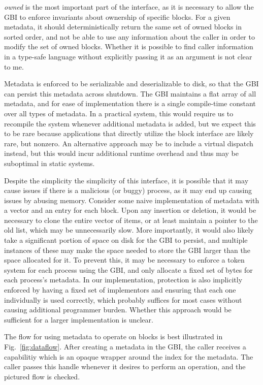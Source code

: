 \documentclass[letterpaper,twocolumn,10pt]{article}
\begin{document}
\textit{owned} is the most important part of the interface, as it is necessary to allow the GBI
to enforce invariants about ownership of specific blocks. For a given metadata, it should
deterministically return the same set of owned blocks in sorted order, and not be able to use
any information about the caller in order to modify the set of owned blocks. Whether it is
possible to find caller information in a type-safe language without explicitly passing it as an
argument is not clear to me.

Metadata is enforced to be serializable and deserializable to disk, so that the GBI can persist
this metadata across shutdown. The GBI maintains a flat array of all metadata, and for ease of
implementation there is a single compile-time constant over all types of metadata. In a
practical system, this would require us to recompile the system whenever additional metadata is
added, but we expect this to be rare because applications that directly utilize the block
interface are likely rare, but nonzero. An alternative approach may be to include a virtual
dispatch instead, but this would incur additional runtime overhead and thus may be suboptimal in
static systems.

Despite the simplicity the simplicity of this interface, it is possible that it may cause issues
if there is a malicious (or buggy) process, as it may end up causing issues by abusing memory.
Consider some naive implementation of metadata with a vector and an entry for each block.
Upon any insertion or deletion, it would be necessary to clone the entire vector of items, or at
least maintain a pointer to the old list, which may be unnecessarily slow. More importantly, it
would also likely take a significant portion of space on disk for the GBI to persist, and
multiple instances of these may make the space needed to store the GBI larger than the space
allocated for it. To prevent this, it may be necessary to enforce a token system for each
process using the GBI, and only allocate a fixed set of bytes for each process's metadata.  In
our implementation, protection is also implicitly enforced by having a fixed set of implementors
and ensuring that each one individually is used correctly, which probably suffices for most
cases without causing additional programmer burden. Whether this approach would be sufficient
for a larger implementation is unclear.

The flow for using metadata to operate on blocks is best illustrated in Fig.~\ref{fig:dataflow}.
After creating a metadata in the GBI, the caller receives a capabilitiy which is an opaque
wrapper around the index for the metadata. The caller passes this handle whenever it desires to
perform an operation, and the pictured flow is checked.
\end{document}
